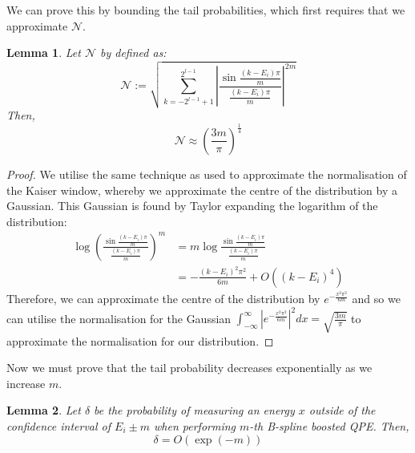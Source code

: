 \documentclass[a4paper,twocolumn,,accepted=2025-05-27]{quantumarticle}
\newtheorem{lemma}{Lemma}[theorem]
\theoremstyle{empty}
\begin{document}
We can prove this by bounding the tail probabilities, which first requires that we approximate $\mathcal{N}$.
\begin{lemma}
    Let $\mathcal{N}$ by defined as:
    \begin{equation}
       \mathcal{N} := \sqrt{\sum_{k=-2^{l-1}+1}^{2^{l-1}} \left|\frac{\sin \frac{(k-E_i)\pi}{m}}{ \frac{(k-E_i)\pi}{m}}\right|^{2m}}
    \end{equation} 
    Then, 
    \begin{equation}
        \mathcal{N} \approx \left(\frac{3m}{\pi}\right)^{\frac{1}{4}}
    \end{equation}
    \label{lemma:bspline_norm}
\end{lemma}
\begin{proof}
    We utilise the same technique as \cite{Berry:2022ccu} used to approximate the normalisation of the Kaiser window, whereby we approximate the centre of the distribution by a Gaussian. This Gaussian is found by Taylor expanding the logarithm of the distribution:
    \begin{align}
                \log \left(\frac{\sin \frac{(k-E_i)\pi}{m}}{ \frac{(k-E_i)\pi}{m}}\right)^m &= m \log \frac{\sin \frac{(k-E_i)\pi}{m}}{ \frac{(k-E_i)\pi}{m}}\\
                &= - \frac{(k-E_i)^2 \pi^2}{6m} + O\left((k-E_i)^4\right)
    \end{align}
    Therefore, we can approximate the centre of the distribution by $e^{ - \frac{x^2 \pi^2}{6m}}$ and so we can utilise the normalisation for the Gaussian $\int_{-\infty}^{\infty}\left|e^{ - \frac{x^2 \pi^2}{6m}}\right|^2 dx = \sqrt{\frac{3m}{\pi}}$ to approximate the normalisation for our distribution.

\end{proof}
Now we must prove that the tail probability decreases exponentially as we increase $m$.
\begin{lemma}
    Let $\delta$ be the probability of measuring an energy $x$ outside of the confidence interval of $E_i\pm m$ when performing $m$-th B-spline boosted QPE. Then,
    \begin{equation}
        \delta = O\left(\exp (-m)\right)
    \end{equation}
    \label{lemma:bspline_prob}
\end{lemma}
\end{document}
